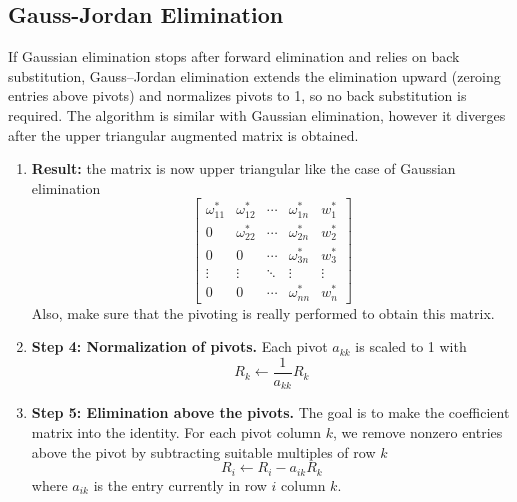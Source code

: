 \documentclass[../../../main.tex]{subfiles}
\begin{document}
\subsection{Gauss-Jordan Elimination}
If Gaussian elimination stops after forward elimination and relies on back substitution, Gauss–Jordan elimination extends the elimination upward (zeroing entries above pivots) and normalizes pivots to 1, so no back substitution is required.
The algorithm is similar with Gaussian elimination, however it diverges after the upper triangular augmented  matrix is obtained.
\begin{enumerate}
    \item \textbf{Result:} the matrix is now upper triangular like the case of Gaussian elimination
          \[
              \begin{bmatrix}
                  \omega_{11}^{*} & \omega_{12}^{*} & \cdots & \omega_{1n}^{*} & w_1^{*} \\
                  0               & \omega_{22}^{*} & \cdots & \omega_{2n}^{*} & w_2^{*} \\
                  0               & 0               & \cdots & \omega_{3n}^{*} & w_3^{*} \\
                  \vdots          & \vdots          & \ddots & \vdots          & \vdots  \\
                  0               & 0               & \cdots & \omega_{nn}^{*} & w_n^{*}
              \end{bmatrix}
          \]
          Also, make  sure  that the pivoting is really performed to obtain this matrix.
    \item \textbf{Step 4: Normalization of pivots.}
          Each pivot $a_{kk}$ is scaled to 1 with
          \begin{equation*}
              R_k \leftarrow \frac{1 }{a_{kk}}R_k
          \end{equation*}
    \item \textbf{Step 5: Elimination above the pivots.}
          The goal is to make the coefficient matrix into the identity.
          For each pivot column $k$, we remove nonzero entries above the pivot by subtracting suitable multiples of row $k$
          \begin{equation*}
              R_i \leftarrow R_i -a_{ik}R_k
          \end{equation*}
          where $a_{ik}$ is the entry currently in row $i$ column $k$.
\end{enumerate}
\end{document}

